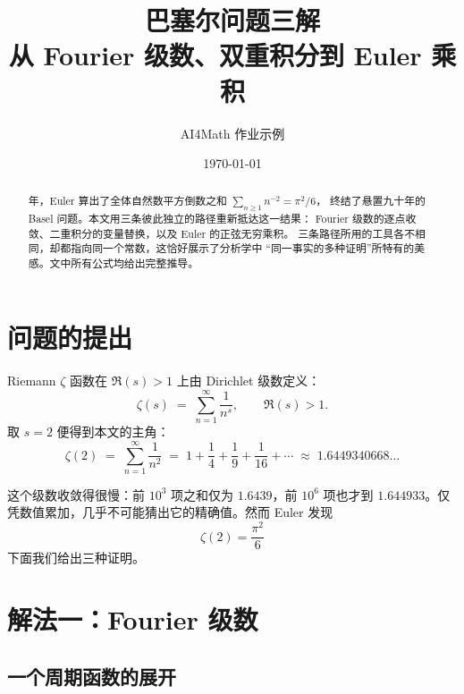 \documentclass[11pt,a4paper]{ctexart}
\title{\bfseries 巴塞尔问题三解\\[6pt]
       \large 从 Fourier 级数、双重积分到 Euler 乘积}
\author{AI4Math 作业示例}
\date{\today}
\theoremstyle{definition}
\theoremstyle{remark}
\begin{document}
\maketitle
\thispagestyle{empty}

\begin{abstract}
 年，Euler 算出了全体自然数平方倒数之和 $\sum_{n\ge 1} n^{-2}=\pi^{2}/6$，
终结了悬置九十年的 Basel 问题。本文用三条彼此独立的路径重新抵达这一结果：
Fourier 级数的逐点收敛、二重积分的变量替换，以及 Euler 的正弦无穷乘积。
三条路径所用的工具各不相同，却都指向同一个常数，这恰好展示了分析学中
``同一事实的多种证明''所特有的美感。文中所有公式均给出完整推导。
\end{abstract}

\tableofcontents
\vspace{1em}

\section{问题的提出}

Riemann $\zeta$ 函数在 $\Re(s)>1$ 上由 Dirichlet 级数定义：
\begin{equation}
  \zeta(s) \;=\; \sum_{n=1}^{\infty} \frac{1}{n^{s}},
  \qquad \Re(s) > 1 .
  \label{eq:zeta-def}
\end{equation}
取 $s=2$ 便得到本文的主角：
\begin{equation}
  \zeta(2) \;=\; \sum_{n=1}^{\infty}\frac{1}{n^{2}}
  \;=\; 1+\frac{1}{4}+\frac{1}{9}+\frac{1}{16}+\cdots
  \;\approx\; 1.6449340668\ldots
  \label{eq:zeta2}
\end{equation}

这个级数收敛得很慢：前 $10^{3}$ 项之和仅为 $1.6439$，前 $10^{6}$ 项也才到
$1.644933$。仅凭数值累加，几乎不可能猜出它的精确值。然而 Euler 发现
\begin{equation}
  \boxed{\;\zeta(2)=\frac{\pi^{2}}{6}\;}
  \label{eq:basel}
\end{equation}
下面我们给出三种证明。

\section{解法一：Fourier 级数}

\subsection{一个周期函数的展开}
\end{document}
